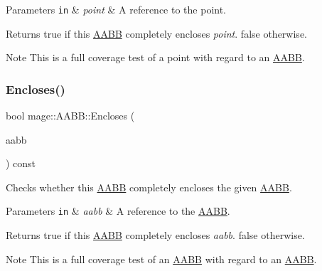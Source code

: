 \begin{DoxyParams}[1]{Parameters}
\mbox{\tt in}  & {\em point} & A reference to the point. \\
\hline
\end{DoxyParams}
\begin{DoxyReturn}{Returns}
{\ttfamily true} if this \hyperlink{classmage_1_1_a_a_b_b}{A\+A\+BB} completely encloses {\itshape point}. {\ttfamily false} otherwise. 
\end{DoxyReturn}
\begin{DoxyNote}{Note}
This is a full coverage test of a point with regard to an \hyperlink{classmage_1_1_a_a_b_b}{A\+A\+BB}. 
\end{DoxyNote}
\hypertarget{classmage_1_1_a_a_b_b_a06f017756a593461127613e4d77d0944}{}\label{classmage_1_1_a_a_b_b_a06f017756a593461127613e4d77d0944} 
\subsubsection{\texorpdfstring{Encloses()}{Encloses()}\hspace{0.1cm}{\footnotesize\ttfamily [3/4]}}
{\footnotesize\ttfamily bool mage\+::\+A\+A\+B\+B\+::\+Encloses (\begin{DoxyParamCaption}\item[{const \hyperlink{classmage_1_1_a_a_b_b}{A\+A\+BB} \&}]{aabb }\end{DoxyParamCaption}) const\hspace{0.3cm}{\ttfamily [noexcept]}}

Checks whether this \hyperlink{classmage_1_1_a_a_b_b}{A\+A\+BB} completely encloses the given \hyperlink{classmage_1_1_a_a_b_b}{A\+A\+BB}.


\begin{DoxyParams}[1]{Parameters}
\mbox{\tt in}  & {\em aabb} & A reference to the \hyperlink{classmage_1_1_a_a_b_b}{A\+A\+BB}. \\
\hline
\end{DoxyParams}
\begin{DoxyReturn}{Returns}
{\ttfamily true} if this \hyperlink{classmage_1_1_a_a_b_b}{A\+A\+BB} completely encloses {\itshape aabb}. {\ttfamily false} otherwise. 
\end{DoxyReturn}
\begin{DoxyNote}{Note}
This is a full coverage test of an \hyperlink{classmage_1_1_a_a_b_b}{A\+A\+BB} with regard to an \hyperlink{classmage_1_1_a_a_b_b}{A\+A\+BB}. 
\end{DoxyNote}
\hypertarget{classmage_1_1_a_a_b_b_ab906cfa784000d7fd49e9a405825e72f}{}\label{classmage_1_1_a_a_b_b_ab906cfa784000d7fd49e9a405825e72f} 
